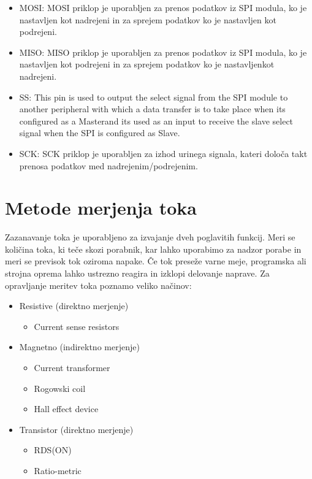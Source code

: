 \documentclass[12pt,a4paper,titlepage,openany]{report}
\begin{document}
\begin{itemize}
\item MOSI: MOSI priklop je uporabljen za prenos podatkov iz SPI modula, ko je nastavljen kot nadrejeni in za sprejem podatkov ko je nastavljen kot podrejeni.
\item MISO: MISO priklop je uporabljen za prenos podatkov iz SPI modula, ko je nastavljen kot podrejeni in za sprejem podatkov ko je nastavljenkot nadrejeni.
\item SS: This pin is used to output the select signal from the SPI module to another peripheral with which a data transfer is to take place when its configured as a Masterand its used as an input to receive the slave select signal when the SPI is configured as Slave.
\item SCK: SCK priklop je uporabljen za izhod urinega signala, kateri določa takt prenosa podatkov med nadrejenim/podrejenim.
\end{itemize}

\section{Metode merjenja toka}
Zazanavanje toka je uporabljeno za izvajanje dveh poglavitih funkcij. Meri se količina toka, ki teče skozi porabnik, kar lahko uporabimo za nadzor porabe in meri se previsok tok oziroma napake. Če tok preseže varne meje, programska ali strojna oprema lahko ustrezno reagira in izklopi delovanje naprave. Za opravljanje meritev toka poznamo veliko načinov:

\begin{itemize}
\item Resistive (direktno merjenje)

\begin{itemize}
\item Current sense resistors
\end{itemize}

 \item Magnetno (indirektno merjenje)

\begin{itemize}
\item Current transformer
\item Rogowski coil
\item Hall effect device
\end{itemize}

\item Transistor (direktno merjenje)

\begin{itemize}
\item RDS(ON)
\item Ratio-metric
\end{itemize}

\end{itemize}
\end{document}
